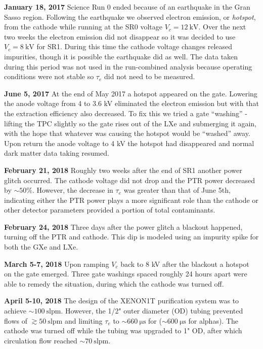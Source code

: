 \textbf{January 18, 2017} Science Run 0 ended because of an earthquake in the Gran Sasso region.  Following the earthquake we observed
electron emission, or \textit{hotspot}, from the cathode while running at the SR0 voltage $V_c = 12\ \mathrm{kV}$.  Over the next two
weeks the electron emission did
not disappear so it was decided to use $V_c = 8\ \mathrm{kV}$ for SR1.  During this time the cathode voltage changes released impurities,
though it is possible the earthquake did as well.  The data taken during this period was not used in the run-combined analysis because
operating conditions were not stable so $\tau_e$ did not need to be measured.

\textbf{June 5, 2017}  At the end of May 2017 a hotspot appeared on the gate.  Lowering the anode voltage from 4 to 3.6 kV eliminated the
electron emission but with that the extraction efficiency also decreased.  To fix this we tried a gate ``washing'' - lifting the TPC
slightly so the gate rises out of the LXe and submerging it again, with the hope that whatever was causing the hotspot would be ``washed''
away.  Upon return the anode voltage to 4 kV the hotspot had disappeared and normal dark matter data taking resumed.

\textbf{February 21, 2018}  Roughly two weeks after the end of SR1 another power glitch occurred.  The cathode voltage did not drop and
the PTR power decreased by ${\sim} 50\%$.  However, the decrease in $\tau_e$ was greater than that of June 5th, indicating either the PTR
power plays a more significant role than the cathode or other detector parameters provided a portion of total contaminants.

\textbf{February 24, 2018}  Three days after the power glitch a blackout happened, turning off the PTR and cathode.  This dip is modeled
using an impurity spike for both the GXe and LXe.

\textbf{March 5-7, 2018}  Upon ramping $V_c$ back to 8 kV after the blackout a hotspot on the gate emerged.  Three gate washings spaced
roughly 24 hours apart were able to remedy the situation, during which the cathode was turned off.

\textbf{April 5-10, 2018}  The design of the XENON1T purification system was to achieve ${\sim} 100\ \mathrm{slpm}$.  However, the
1/2" outer diameter (OD) tubing prevented flows of $\gtrsim 50\ \mathrm{slpm}$ and limiting $\tau_e$ to ${\sim} 660\ \mathrm{\mu s}$ for
\metakr (${\sim} 600\ \mathrm{\mu s}$ for alphas).  The cathode was turned off while the tubing was upgraded to 1" OD, after which
circulation flow reached ${\sim} 70\ \mathrm{slpm}$.

